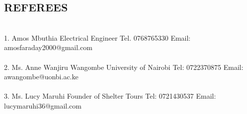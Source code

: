 \documentclass[margin]{res}
\begin{document}
\begin{resume}
\section{REFEREES}\\
1. Amos Mbuthia
Electrical Engineer
Tel. 0768765330
Email: amosfaraday2000@gmail.com  \\\\
2. Ms. Anne Wanjiru Wangombe
University of Nairobi
Tel: 0722370875
Email: awangombe@uonbi.ac.ke  \\\\
3. Ms. Lucy Maruhi
Founder of Shelter Tours
Tel: 0721430537
Email: lucymaruhi36@gmail.com



\end{resume}
\end{document}

